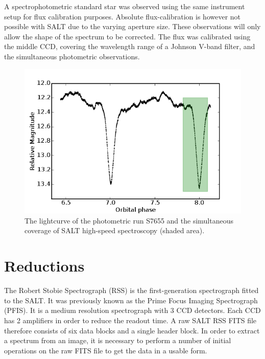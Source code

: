 A spectrophotometric standard star was observed using the same instrument setup for flux calibration purposes. Absolute flux-calibration is however not possible with SALT due to the varying aperture size. These observations will only allow the shape of the spectrum to be corrected. The flux was calibrated using the middle CCD, covering the wavelength range of a Johnson V-band filter, and the simultaneous photometric observations. 

\begin{figure}
 \centering
 \includegraphics[width=0.9\columnwidth,bb=0 0 600 400]{images/S7655_SALT_coverage.png}
 \caption[Simultaneous photometry and spectroscopy]{The lightcurve of the photometric run S7655 and the simultaneous coverage of SALT high-speed spectroscopy (shaded area).}
 \label{spec_SALT_coverage}
\end{figure}




\section{Reductions}

The Robert Stobie Spectrograph (RSS) is the first-generation spectrograph fitted to the SALT. It was previously known as the Prime Focus Imaging Spectrograph (PFIS). It is a medium resolution spectrograph with 3 CCD detectors. Each CCD has 2 amplifiers in order to reduce the readout time. A raw SALT RSS FITS file therefore consists of six data blocks and a single header block. In order to extract a spectrum from an image, it is necessary to perform a number of initial operations on the raw FITS file to get the data in a usable form. 

